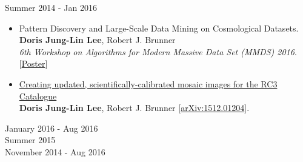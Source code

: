 \documentclass{res}
\begin{document}
\begin{resume}
   \vspace{-10pt}
\vspace{5pt}
\hspace{-10pt}{\normalsize\bf University of Illinois Laboratory for Cosmological Data Mining} \hspace{40pt} Summer 2014 - Jan 2016
\begin{itemize}[leftmargin=0.3em]
 \item Pattern Discovery and Large-Scale Data Mining on Cosmological Datasets.
  \\ {\footnotesize\textbf{Doris Jung-Lin Lee}, Robert J. Brunner 
  \vspace{-5pt}
  \\ \textit{6th Workshop on Algorithms for Modern Massive Data Set (MMDS) 2016}.  [\href{http://dorisjunglinlee.com/files/MMDS_poster.pdf}{Poster}]}
 \item \href{http://arxiv.org/abs/1512.01204}{Creating updated, scientifically-calibrated mosaic images for the RC3 Catalogue} 
 \vspace{-5pt}
 \\ {\footnotesize\textbf{Doris Jung-Lin Lee}, Robert J. Brunner  [\href{http://arxiv.org/abs/1512.01204}{arXiv:1512.01204}]}. 
\end{itemize}
\vspace{-5pt}
\hspace{-10pt}{\normalsize\bf UC Berkeley AMP Lab Big Data Genomics Group} \hspace{100pt}  January 2016 - Aug 2016 \\
\hspace{-10pt}{\normalsize\bf Princeton Astrophysical Fluid Dynamics Group} \hspace{165pt}  Summer 2015 \\
\hspace{-10pt}{\normalsize\bf UC Berkeley Star Formation Theory Group} \hspace{125pt}  November 2014 - Aug 2016
\newpage

\end{resume}
\end{document}
